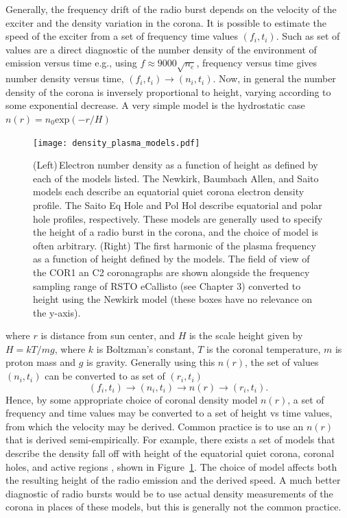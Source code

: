 Generally, the frequency drift of the radio burst depends on the velocity of the exciter and the density variation in the corona. It is possible to estimate the speed of the exciter from a set of frequency time values $(f_i, t_i)$. Such as set of values are a direct diagnostic of the number density of the environment of emission versus time e.g., using $f \approx 9000\sqrt{n_e}$, frequency versus time gives number density versus time, $(f_i, t_i) \rightarrow (n_i,t_i)$.
Now, in general the number density of the corona is inversely proportional to height, varying according to some exponential decrease. A very simple model is the hydrostatic case $n(r) = n_0\mathrm{exp}(-r/H)$
\begin{figure}[t!]
\begin{center}
\texttt{[image: density\_plasma\_models.pdf]}
\caption[Various models for electron number density in the corona]{(Left)\,Electron number density as a function of height as defined by each of the models listed. The Newkirk, Baumbach Allen, and Saito models each describe an equatorial quiet corona electron density profile. The Saito Eq Hole and Pol Hol describe equatorial and polar hole profiles, respectively. These models are generally used to specify the height of a radio burst in the corona, and the choice of model is often arbitrary. (Right) The first harmonic of the plasma frequency as a function of height defined by the models. The field of view of the COR1 an C2 coronagraphs are shown alongside the frequency sampling range of RSTO eCallisto (see Chapter 3) converted to height using the Newkirk model (these boxes have no relevance on the y-axis).}%
\label{fig:frequency_model}
\end{center}
\end{figure}
where $r$ is distance from sun center, and $H$ is the scale height given by $H = kT/mg$, where $k$ is Boltzman's constant, $T$ is the coronal temperature, $m$ is proton mass and $g$ is gravity. Generally using this $n(r)$, the set of values $(n_i,t_i)$ can be converted to as set of $(r_i,t_i)$
\begin{equation}
(f_i, t_i) \rightarrow (n_i,t_i) \rightarrow n(r) \rightarrow (r_i,t_i).
\end{equation}
Hence, by some appropriate choice of coronal density model $n(r)$, a set of frequency and time values may be converted to a set of height vs time values, from which the velocity may be derived.
Common practice is to use an $n(r)$ that is derived semi-empirically. For example, there exists a set of models that describe the density fall off with height of the equatorial quiet corona, coronal holes, and active regions \citet{allen1947, newkirk1961, saito1977}, shown in Figure~\ref{fig:frequency_model}. The choice of model affects both the resulting height of the radio emission and the derived speed. A much better diagnostic of radio bursts would be to use actual density measurements of the corona in places of these models, but this is generally not the common practice.

